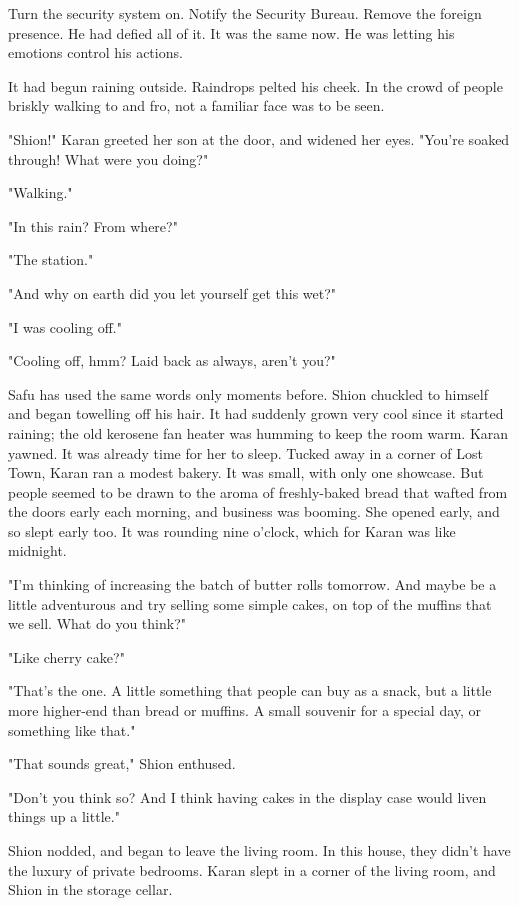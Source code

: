 Turn the security system on. Notify the Security Bureau. Remove the
foreign presence. He had defied all of it. It was the same now. He was
letting his emotions control his actions.

It had begun raining outside. Raindrops pelted his cheek. In the crowd
of people briskly walking to and fro, not a familiar face was to be
seen.

"Shion!" Karan greeted her son at the door, and widened her eyes.
"You're soaked through! What were you doing?"

"Walking."

"In this rain? From where?"

"The station."

"And why on earth did you let yourself get this wet?"

"I was cooling off."

"Cooling off, hmm? Laid back as always, aren't you?"

Safu has used the same words only moments before. Shion chuckled to
himself and began towelling off his hair. It had suddenly grown very
cool since it started raining; the old kerosene fan heater was humming
to keep the room warm. Karan yawned. It was already time for her to
sleep. Tucked away in a corner of Lost Town, Karan ran a modest bakery.
It was small, with only one showcase. But people seemed to be drawn to
the aroma of freshly-baked bread that wafted from the doors early each
morning, and business was booming. She opened early, and so slept early
too. It was rounding nine o'clock, which for Karan was like midnight.

"I'm thinking of increasing the batch of butter rolls tomorrow. And
maybe be a little adventurous and try selling some simple cakes, on top
of the muffins that we sell. What do you think?"

"Like cherry cake?"

"That's the one. A little something that people can buy as a snack, but
a little more higher-end than bread or muffins. A small souvenir for a
special day, or something like that."

"That sounds great," Shion enthused.

"Don't you think so? And I think having cakes in the display case would
liven things up a little."

Shion nodded, and began to leave the living room. In this house, they
didn't have the luxury of private bedrooms. Karan slept in a corner of
the living room, and Shion in the storage cellar.

